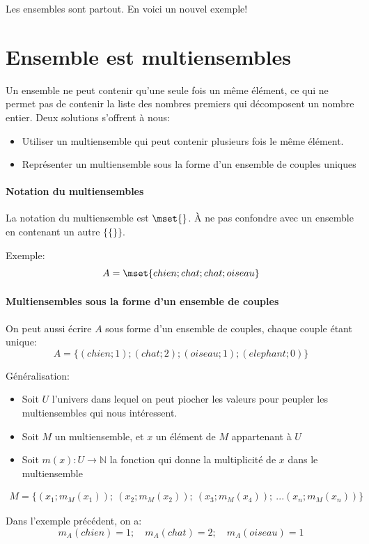 Les ensembles sont partout. En voici un nouvel exemple!
\section{Ensemble est multiensembles}
Un ensemble ne peut contenir qu'une seule fois un même élément, ce qui ne permet pas de contenir la liste des nombres premiers qui décomposent un nombre entier. Deux solutions s'offrent à nous:
\begin{itemize}
    \item Utiliser un multiensemble qui peut contenir plusieurs fois le même élément.
    \item Représenter un multiensemble sous la forme d'un ensemble de couples uniques
\end{itemize}

\paragraph{Notation du multiensembles}
La notation du multiensemble est $\mset{}$. À ne pas confondre avec un ensemble en contenant un autre $\{\{\}\}$.

Exemple:
\[A=\mset{chien;chat;chat;oiseau}\]

\paragraph{Multiensembles sous la forme d'un ensemble de couples}
On peut aussi écrire $A$ sous forme d'un ensemble de couples, chaque couple étant unique:
\[A=\{(chien;1);(chat;2);(oiseau;1);(elephant;0)\}\]

Généralisation:
\begin{itemize}
    \item Soit $U$ l'univers dans lequel on peut piocher les valeurs pour peupler les multiensembles qui nous intéressent.
    \item Soit $M$ un multiensemble, et $x$ un élément de $M$ appartenant à $U$
    \item Soit $m(x): U \rightarrow \mathbb{N}$ la fonction qui donne la multiplicité de $x$ dans le multiensemble
\end{itemize}
\begin{gather*}
    M=\{(x_1; m_M(x_1)); \ (x_2; m_M(x_2)); \ (x_3; m_M(x_4)); \ ...(x_n; m_M(x_n))\}
\end{gather*}

Dans l'exemple précédent, on a:
\[m_A(chien)=1;\quad m_A(chat)=2;\quad m_A(oiseau)=1\]


